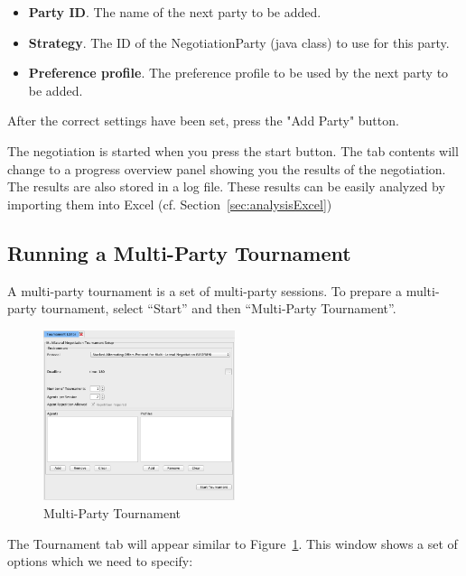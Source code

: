 \documentclass[]{article}
\begin{document}
\medskip
\begin{minipage}{.8 \textwidth}
\begin{itemize}
	\item \textbf{Party ID}. The name of the next party to be added.
	\item \textbf{Strategy}. The ID of the NegotiationParty (java class) to use for this party.
	\item \textbf{Preference profile}. The preference profile to be used by the next party to be added.
\end{itemize}
\end{minipage}
\medskip

After the correct settings have been set, press the "Add Party" button.

The negotiation is started when you press the start button. The tab contents will change to  a progress overview panel
showing you the results of the negotiation. The results are also stored in a log file.
 These results can be easily analyzed by importing them into Excel (cf. Section~\ref{sec:analysisExcel})


\subsection{Running a Multi-Party Tournament}
A multi-party tournament is a set of multi-party sessions. To prepare a multi-party tournament, select  ``Start'' and then ``Multi-Party Tournament''. 

\begin{figure}[htb]
	\centering
	\includegraphics[width=0.5\textwidth]{media/multipartytournament.png}
\caption{Multi-Party Tournament}\label{Fig:multipartytournament}
\end{figure}

The Tournament tab will appear similar to Figure~\ref{Fig:multipartytournament}. This window shows a set of options which we need to specify:
\end{document}
